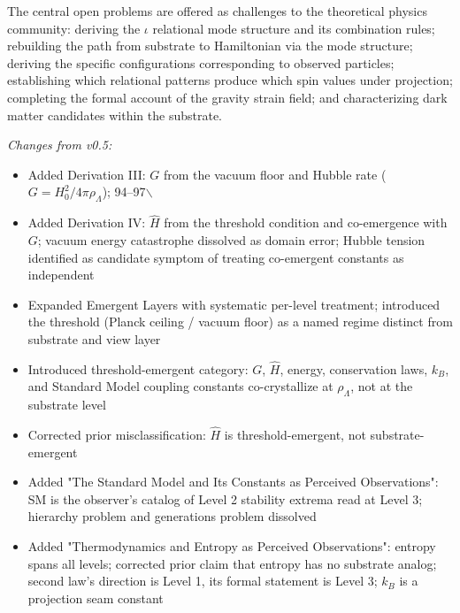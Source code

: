 \documentclass[11pt,letterpaper]{article}
\begin{document}
The central open problems are offered as challenges to the theoretical physics community: deriving the \(\iota\) relational mode structure and its combination rules; rebuilding the path from substrate to Hamiltonian via the mode structure; deriving the specific configurations corresponding to observed particles; establishing which relational patterns produce which spin values under projection; completing the formal account of the gravity strain field; and characterizing dark matter candidates within the substrate.

\emph{Changes from v0.5:}
\begin{itemize}
\item Added Derivation III: \(G\) from the vacuum floor and Hubble rate (\(G = H_0^2/4\pi\rho_\Lambda\)); 94--97$\backslash$%
\item Added Derivation IV: \(\hat{H}\) from the threshold condition and co-emergence with \(G\); vacuum energy catastrophe dissolved as domain error; Hubble tension identified as candidate symptom of treating co-emergent constants as independent
\item Expanded Emergent Layers with systematic per-level treatment; introduced the threshold (Planck ceiling / vacuum floor) as a named regime distinct from substrate and view layer
\item Introduced threshold-emergent category: \(G\), \(\hat{H}\), energy, conservation laws, \(k_B\), and Standard Model coupling constants co-crystallize at \(\rho_\Lambda\), not at the substrate level
\item Corrected prior misclassification: \(\hat{H}\) is threshold-emergent, not substrate-emergent
\item Added "The Standard Model and Its Constants as Perceived Observations": SM is the observer's catalog of Level 2 stability extrema read at Level 3; hierarchy problem and generations problem dissolved
\item Added "Thermodynamics and Entropy as Perceived Observations": entropy spans all levels; corrected prior claim that entropy has no substrate analog; second law's direction is Level 1, its formal statement is Level 3; \(k_B\) is a projection seam constant
\end{itemize}
\end{document}
